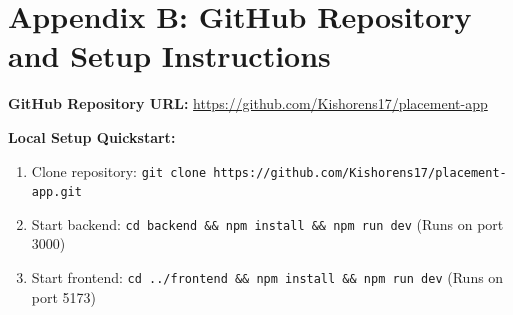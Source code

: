 \documentclass[12pt,a4paper]{report}
\begin{document}
\section*{Appendix B: GitHub Repository and Setup Instructions}
\noindent\textbf{GitHub Repository URL:} \url{https://github.com/Kishorens17/placement-app}

\noindent\textbf{Local Setup Quickstart:}
\begin{enumerate}
    \item Clone repository: \texttt{git clone https://github.com/Kishorens17/placement-app.git}
    \item Start backend: \texttt{cd backend \&\& npm install \&\& npm run dev} (Runs on port 3000)
    \item Start frontend: \texttt{cd ../frontend \&\& npm install \&\& npm run dev} (Runs on port 5173)
\end{enumerate}
\end{document}
